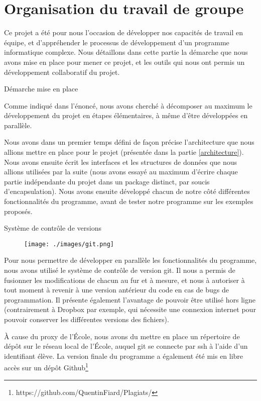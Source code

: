 \documentclass[a4paper,twoside,12pt]{article}
\newcounter{partie}
\newcounter{sous-partie}
\newenvironment{partie}[1]
{
\section{#1}
}
{

}
\newenvironment{sous-partie}[1]
{
\subsection{#1}
}
{

}
\begin{document}
\begin{partie}{Organisation du travail de groupe}

Ce projet a été pour nous l'occasion de développer nos capacités de travail en équipe, et d'appréhender le processus de développement d'un programme informatique complexe. Nous détaillons dans cette partie la démarche que nous avons mise en place pour mener ce projet, et les outils qui nous ont permis un développement collaboratif du projet.

\begin{sous-partie}{Démarche mise en place}
\begin{paragraph}{}
Comme indiqué dans l'énoncé, nous avons cherché à décomposer au maximum le développement du projet en étapes élémentaires, à même d'être développées en parallèle.
\end{paragraph}
\begin{paragraph}{}
Nous avons dans un premier temps défini de façon précise l'architecture que nous allions mettre en place pour le projet (présentée dans la partie \ref{architecture}). Nous avons ensuite écrit les interfaces et les structures de données que nous allions utilisées par la suite (nous avons essayé au maximum d'écrire chaque partie indépendante du projet dans un package distinct, par soucis d'encapsulation). Nous avons ensuite développé chacun de notre côté différentes fonctionnalités du programme, avant de tester notre programme sur les exemples proposés.
\end{paragraph}
\end{sous-partie}

\begin{sous-partie}{Système de contrôle de versions}
\begin{figure}[htb]
\centering
\texttt{[image: ./images/git.png]}
\end{figure}

\begin{paragraph}{}
Pour nous permettre de développer en parallèle les fonctionnalités du programme, nous avons utilisé le système de contrôle de version git. Il nous a permis de fusionner les modifications de chacun au fur et à mesure, et nous à autoriser à tout moment à revenir à une version antérieur du code en cas de bugs de programmation. Il présente également l'avantage de pouvoir être utilisé hors ligne (contrairement à Dropbox par exemple, qui nécessite une connexion internet pour pouvoir conserver les différentes versions des fichiers).
\end{paragraph}

\begin{paragraph}{}
À cause du proxy de l'École, nous avons du mettre en place un répertoire de dépôt sur le réseau local de l'École, auquel git se connecte par ssh à l'aide d'un identifiant élève. La version finale du programme a également été mis en libre accès sur un dépôt Github\footnote{https://github.com/QuentinFiard/Plagiats/}
\end{paragraph}

\end{sous-partie}

\end{partie}
\end{document}
